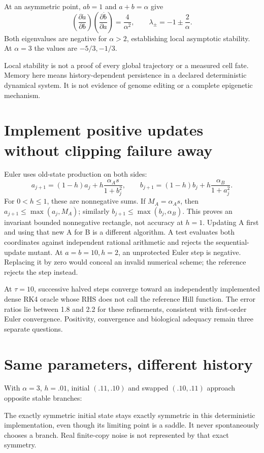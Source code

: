 At an asymmetric point, $ab=1$ and $a+b=\alpha$ give
\[
 \left(\frac{\partial\dot a}{\partial b}\right)
 \left(\frac{\partial\dot b}{\partial a}\right)=\frac4{\alpha^2},
 \qquad \lambda_\pm=-1\pm\frac2\alpha.
\]
Both eigenvalues are negative for $\alpha>2$, establishing local asymptotic
stability. At $\alpha=3$ the values are $-5/3,-1/3$.
\begin{center}\end{center}
Local stability is not a proof of every global trajectory or a measured cell fate.
Memory here means history-dependent persistence in a declared deterministic
dynamical system. It is not evidence of genome editing or a complete epigenetic
mechanism.

\section{Implement positive updates without clipping failure away}
Euler uses old-state production on both sides:
\[
 a_{j+1}=(1-h)a_j+h\frac{\alpha_A s}{1+b_j^2},\qquad
 b_{j+1}=(1-h)b_j+h\frac{\alpha_B}{1+a_j^2}.
\]
For $0<h\le1$, these are nonnegative sums. If $M_A=\alpha_A s$,
then $a_{j+1}\le\max(a_j,M_A)$; similarly
$b_{j+1}\le\max(b_j,\alpha_B)$. This proves an invariant bounded nonnegative
rectangle, not accuracy at $h=1$.
Updating A first and using that new A for B is a different algorithm.
A test evaluates both coordinates against independent rational arithmetic and
rejects the sequential-update mutant. At $a=b=10,h=2$, an unprotected Euler
step is negative. Replacing it by zero would conceal an invalid numerical scheme;
the reference rejects the step instead.

\begin{center}\end{center}
At $\tau=10$, successive halved steps converge toward an independently implemented
dense RK4 oracle whose RHS does not call the reference Hill function.
The error ratios lie between 1.8 and 2.2 for these refinements, consistent with
first-order Euler convergence. Positivity, convergence and biological adequacy
remain three separate questions.

\section{Same parameters, different history}
With $\alpha=3$, $h=.01$, initial $(.11,.10)$ and swapped $(.10,.11)$
approach opposite stable branches:
\begin{center}\end{center}
The exactly symmetric initial state stays exactly symmetric in this deterministic
implementation, even though its limiting point is a saddle. It never spontaneously
chooses a branch. Real finite-copy noise is not represented by that exact symmetry.

